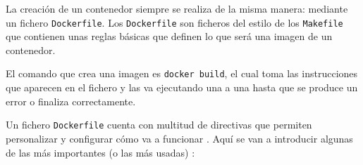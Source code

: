 La creación de un contenedor siempre se realiza de la misma manera: mediante un
fichero \texttt{Dockerfile}. Los \texttt{Dockerfile} son ficheros del estilo de
los \texttt{Makefile} que contienen unas reglas básicas que definen lo que será
una imagen de un contenedor.

El comando que crea una imagen es \lstinline[style=bash]!docker build!, el cual
toma las instrucciones que aparecen en el fichero y las va ejecutando una a una
hasta que se produce un error o finaliza correctamente.

Un fichero \texttt{Dockerfile} cuenta con multitud de directivas que permiten
personalizar y configurar cómo va a funcionar \cite{DockerfileReference2021}.
Aquí se van a introducir algunas de las más importantes (o las más usadas) \cite{jethvaHowDockerfileWorks}:

